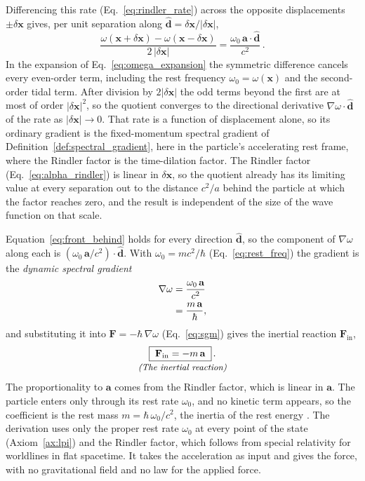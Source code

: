 \documentclass[aps,prd,onecolumn,tightenlines,nofootinbib,notitlepage,11pt,floatfix]{revtex4-2}
\theoremstyle{indentedtheorem}
\begin{document}
Differencing this rate (Eq.~\eqref{eq:rindler_rate}) across the opposite displacements $\pm\delta\mathbf{x}$ gives, per unit separation along $\hat{\mathbf{d}}=\delta\mathbf{x}/|\delta\mathbf{x}|$,
\begin{equation}
    \frac{\omega(\mathbf{x}+\delta\mathbf{x})-\omega(\mathbf{x}-\delta\mathbf{x})}{2\,|\delta\mathbf{x}|} = \frac{\omega_0\,\mathbf{a}\cdot\hat{\mathbf{d}}}{c^2} \, .
    \label{eq:front_behind}
\end{equation}
In the expansion of Eq.~\eqref{eq:omega_expansion} the symmetric difference cancels every even-order term, including the rest frequency $\omega_0=\omega(\mathbf{x})$ and the second-order tidal term. After division by $2|\delta\mathbf{x}|$ the odd terms beyond the first are at most of order $|\delta\mathbf{x}|^2$, so the quotient converges to the directional derivative $\nabla\omega\cdot\hat{\mathbf{d}}$ of the rate as $|\delta\mathbf{x}|\to0$. That rate is a function of displacement alone, so its ordinary gradient is the fixed-momentum spectral gradient of Definition~\ref{def:spectral_gradient}, here in the particle's accelerating rest frame, where the Rindler factor is the time-dilation factor. The Rindler factor (Eq.~\eqref{eq:alpha_rindler}) is linear in $\delta\mathbf{x}$, so the quotient already has its limiting value at every separation out to the distance $c^2/a$ behind the particle at which the factor reaches zero, and the result is independent of the size of the wave function on that scale.

Equation~\eqref{eq:front_behind} holds for every direction $\hat{\mathbf{d}}$, so the component of $\nabla\omega$ along each is $(\omega_0\,\mathbf{a}/c^2)\cdot\hat{\mathbf{d}}$. With $\omega_0=mc^2/\hbar$ (Eq.~\eqref{eq:rest_freq}) the gradient is the \emph{dynamic spectral gradient}
\begin{align}
    \nabla\omega &= \frac{\omega_0\,\mathbf{a}}{c^2} \notag\\
    &= \frac{m\,\mathbf{a}}{\hbar} ,
    \label{eq:inertia_gradient}
\end{align}
and substituting it into $\mathbf{F}=-\hbar\,\nabla\omega$ (Eq.~\eqref{eq:sgm}) gives the inertial reaction $\mathbf{F}_\text{in}$,
\begin{equation}
    \begin{gathered}
    \boxed{\;\mathbf{F}_\text{in} = -m\,\mathbf{a}\;} \, . \\[-3pt]
    \text{\small\itshape (The inertial reaction)}
    \end{gathered}
    \label{eq:inertia}
\end{equation}
The proportionality to $\mathbf{a}$ comes from the Rindler factor, which is linear in $\mathbf{a}$. The particle enters only through its rest rate $\omega_0$, and no kinetic term appears, so the coefficient is the rest mass $m=\hbar \, \omega_0/c^2$, the inertia of the rest energy \citep{Einstein1905Inertia}. The derivation uses only the proper rest rate $\omega_0$ at every point of the state (Axiom~\ref{ax:lpi}) and the Rindler factor, which follows from special relativity for worldlines in flat spacetime. It takes the acceleration as input and gives the force, with no gravitational field and no law for the applied force.
\end{document}
